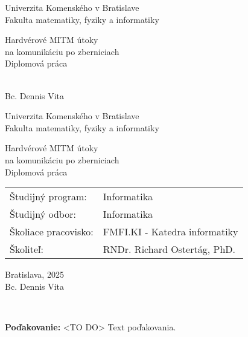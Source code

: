 \documentclass[12pt, twoside]{book}
\def\mfrok{2025}
\def\mfnazov{Hardvérové MITM útoky\\na komunikáciu po zberniciach}
\def\mftyp{Diplomová práca}
\def\mfautor{Bc. Dennis Vita}
\def\mfskolitel{RNDr. Richard Ostertág, PhD. }
\def\mfmiesto{Bratislava, \mfrok}
\def\mfodbor{ Informatika}
\def\program{ Informatika }
\def\mfpracovisko{ FMFI.KI - Katedra informatiky }
\begin{document}
\frontmatter
\pagestyle{empty}

\begin{center}
\sc\large
Univerzita Komenského v Bratislave\\
Fakulta matematiky, fyziky a informatiky

\vfill

{\LARGE\mfnazov}\\
\mftyp
\end{center}

\vfill

{\sc\large 
\noindent \mfrok\\
\mfautor
}

\cleardoublepage


\noindent
\setcounter{page}{1}

\begin{center}
\sc  
\large
Univerzita Komenského v Bratislave\\
Fakulta matematiky, fyziky a informatiky

\vfill

{\LARGE\mfnazov}\\
\mftyp
\end{center}

\vfill

\noindent
\begin{tabular}{ll}
Študijný program: & \program \\
Študijný odbor: & \mfodbor \\
Školiace pracovisko: & \mfpracovisko \\
Školiteľ: & \mfskolitel \\
\end{tabular}

\vfill


\noindent \mfmiesto\\
\mfautor

\cleardoublepage


\newpage 


\cleardoublepage


\newpage
\pagestyle{plain}
~

\vfill
{\bf Poďakovanie:} <TO DO> Text poďakovania.
\end{document}
